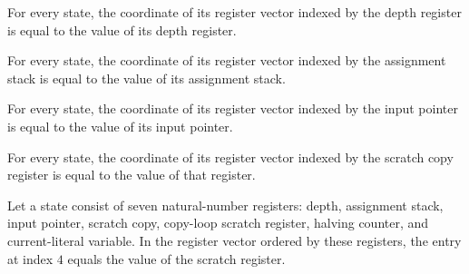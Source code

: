 \begin{lemma}
\label{Complexity.LogProg.TQBFARM.St.toV_K}
\leanok
{}
For every state, the coordinate of its register vector indexed by the depth register is
equal to the value of its depth register.
\end{lemma}

\begin{lemma}
\label{Complexity.LogProg.TQBFARM.St.toV_S}
\leanok
{}
For every state, the coordinate of its register vector indexed by the assignment stack
is equal to the value of its assignment stack.
\end{lemma}

\begin{lemma}
\label{Complexity.LogProg.TQBFARM.St.toV_P}
\leanok
{}
For every state, the coordinate of its register vector indexed by the input pointer is
equal to the value of its input pointer.
\end{lemma}

\begin{lemma}
\label{Complexity.LogProg.TQBFARM.St.toV_T}
\leanok
{}
For every state, the coordinate of its register vector indexed by the scratch copy
register is equal to the value of that register.
\end{lemma}

\begin{lemma}
\label{Complexity.LogProg.TQBFARM.St.toV_Z}
\leanok
{}
Let a state consist of seven natural-number registers: depth, assignment stack, input
pointer, scratch copy, copy-loop scratch register, halving counter, and current-literal
variable. In the register vector ordered by these registers, the entry at index $4$
equals the value of the scratch register.
\end{lemma}

